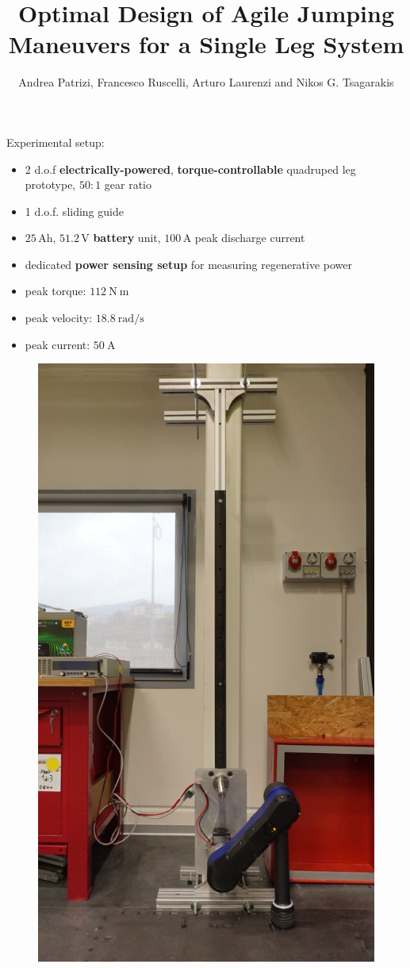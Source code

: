 \documentclass[aspectratio=169]{beamer}
\title{\vspace{0.5cm}\Large Optimal Design of Agile Jumping Maneuvers for a Single Leg System}
\subtitle{\small  Andrea Patrizi, Francesco Ruscelli, Arturo Laurenzi and Nikos G. Tsagarakis \vspace{1cm}}
\institute{Istituto Italiano di Tecnologia}
\begin{document}
\titleframe



\begin{frame}
\begin{multicols}{2}
\vfill\null
Experimental setup: 
\begin{itemize}
\item 2 d.o.f \textbf{electrically-powered}, \textbf{torque-controllable} quadruped leg prototype, $50:1$ gear ratio
\item 1 d.o.f. sliding guide
\item $25\,\mathrm{Ah}$, $51.2\,\mathrm{V}$ \textbf{battery} unit, $100\,\mathrm{A}$ peak discharge current
\item dedicated \textbf{power sensing setup} for measuring regenerative power
\item peak torque: $112~\mathrm{N~m}$
\item peak velocity: $18.8~\mathrm{rad/s}$
\item peak current: $50~\mathrm{A}$
\end{itemize}
\vfill\null
\columnbreak
\vfill\null
\vspace{0.5cm}
\begin{figure}
    \centering
    \includegraphics[width=0.5\columnwidth]{beamer_imgs/jump_sequence_intro_image/real1.png}
\end{figure}
\end{multicols}
\end{frame}
\end{document}
